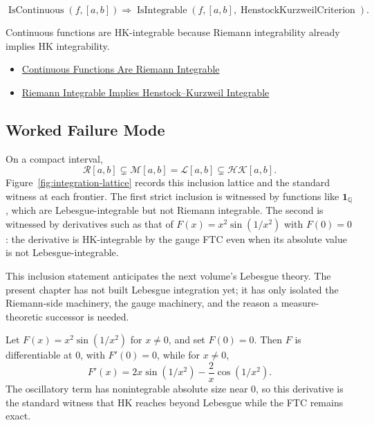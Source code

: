 \begin{remark*}
\[
\operatorname{IsContinuous}(f,[a,b])
\Longrightarrow
\operatorname{IsIntegrable}(f,[a,b],\operatorname{HenstockKurzweilCriterion}).
\]
\end{remark*}

\begin{remark*}[Interpretation]
Continuous functions are HK-integrable because Riemann integrability already
implies HK integrability.
\end{remark*}

\begin{dependencies}
\begin{itemize}
  \item \hyperref[thm:continuous-riemann-integrable]{Continuous Functions Are Riemann Integrable}
  \item \hyperref[thm:riemann-integrable-implies-hk-integrable]{Riemann Integrable Implies Henstock--Kurzweil Integrable}
\end{itemize}
\end{dependencies}

\subsection*{Worked Failure Mode}

\begin{remark*}[Interpretation]
On a compact interval,
\[
  \mathcal R[a,b]\subsetneq \mathcal M[a,b]=\mathcal L[a,b]
  \subsetneq \mathcal{HK}[a,b].
\]
Figure~\ref{fig:integration-lattice} records this inclusion lattice and the
standard witness at each frontier.
The first strict inclusion is witnessed by functions like
\(\mathbf 1_{\mathbb Q}\), which are Lebesgue-integrable but not Riemann
integrable. The second is witnessed by derivatives such as that of
\(F(x)=x^2\sin(1/x
^2)\) with \(F(0)=0\): the derivative is HK-integrable by the
gauge FTC even when its absolute value is not Lebesgue-integrable.

This inclusion statement anticipates the next volume's Lebesgue theory. The
present chapter has not built Lebesgue integration yet; it has only isolated
the Riemann-side machinery, the gauge machinery, and the reason a
measure-theoretic successor is needed.
\end{remark*}



\begin{remark*}[Interpretation]
Let \(F(x)=x^2\sin(1/x^2)\) for \(x\ne0\), and set \(F(0)=0\). Then \(F\) is
differentiable at \(0\), with \(F'(0)=0\), while for \(x\ne0\),
\[
  F'(x)=2x\sin(1/x^2)-\frac{2}{x}\cos(1/x^2).
\]
The oscillatory term has nonintegrable absolute size near \(0\), so this
derivative is the standard witness that HK reaches beyond Lebesgue while the
FTC remains exact.
\end{remark*}

